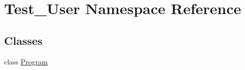 \hypertarget{namespaceTest__User}{}\section{Test\+\_\+\+User Namespace Reference}
\label{namespaceTest__User}
\subsection*{Classes}
\begin{DoxyCompactItemize}
\item 
class \hyperlink{classTest__User_1_1Program}{Program}
\end{DoxyCompactItemize}
